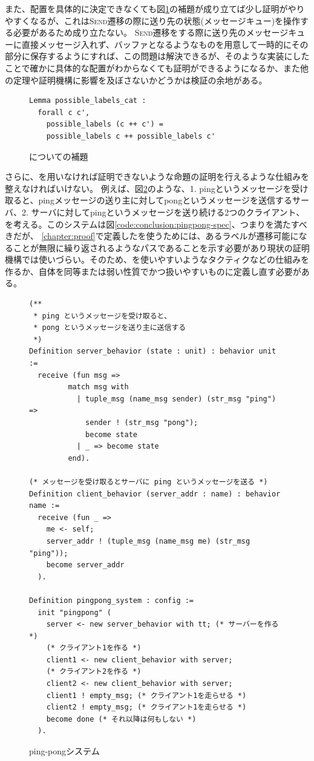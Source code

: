 また、配置を具体的に決定できなくても図\ref{code:conclusion:possible-labels-cat}の補題が成り立てば少し証明がやりやすくなるが、これは\textsc{Send}遷移の際に送り先の状態(メッセージキュー)を操作する必要があるため成り立たない。
\textsc{Send}遷移をする際に送り先のメッセージキューに直接メッセージ入れず、バッファとなるようなものを用意して一時的にその部分に保存するようにすれば、この問題は解決できるが、そのような実装にしたことで確かに具体的な配置がわからなくても証明ができるようになるか、また他の定理や証明機構に影響を及ぼさないかどうかは検証の余地がある。


\begin{figure}[tp]
\begin{lstlisting}
Lemma possible_labels_cat :
  forall c c',
    possible_labels (c ++ c') =
    possible_labels c ++ possible_labels c'
\end{lstlisting}
\label{code:conclusion:possible-labels-cat}
\caption{についての補題}
\end{figure}


さらに、\fairness を用いなければ証明できないような命題の証明を行えるような仕組みを整えなければいけない。
例えば、図\ref{code:conclusion:pingpong}のような、1. pingというメッセージを受け取ると、pingメッセージの送り主に対してpongというメッセージを送信するサーバ、2. サーバに対してpingというメッセージを送り続ける2つのクライアント、を考える。このシステムは図\ref{code:conclusion:pingpong-spec}、つまりを満たすべきだが、
\ref{chapter:proof}で定義したを使うためには、あるラベルが遷移可能になることが無限に繰り返されるようなパスであることを示す必要があり現状の証明機構では使いづらい。そのため、を使いやすいようなタクティクなどの仕組みを作るか、自体を同等または弱い性質でかつ扱いやすいものに定義し直す必要がある。

\begin{figure}[tp]
\begin{lstlisting}
(**
 * ping というメッセージを受け取ると、
 * pong というメッセージを送り主に送信する
 *)
Definition server_behavior (state : unit) : behavior unit :=
  receive (fun msg =>
         match msg with
           | tuple_msg (name_msg sender) (str_msg "ping") =>
             sender ! (str_msg "pong");
             become state
           | _ => become state
         end).

(* メッセージを受け取るとサーバに ping というメッセージを送る *)
Definition client_behavior (server_addr : name) : behavior name :=
  receive (fun _ =>
    me <- self;
    server_addr ! (tuple_msg (name_msg me) (str_msg "ping"));
    become server_addr
  ).

Definition pingpong_system : config :=
  init "pingpong" (
    server <- new server_behavior with tt; (* サーバーを作る *)
    (* クライアント1を作る *)
    client1 <- new client_behavior with server;
    (* クライアント2を作る *)
    client2 <- new client_behavior with server;
    client1 ! empty_msg; (* クライアント1を走らせる *)
    client2 ! empty_msg; (* クライアント1を走らせる *)
    become done (* それ以降は何もしない *)
  ).
\end{lstlisting}
  \label{code:conclusion:pingpong}
  \caption{ping-pongシステム}
\end{figure}

